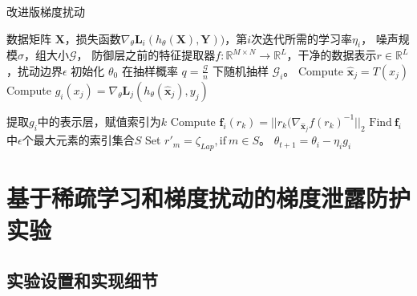 \begin{algorithm}[!htb]
\caption{改进版梯度扰动}
\label{alg:ImprovedDP-SGD}
\begin{algorithmic}[1]
\REQUIRE 数据矩阵 $\mathbf{X}$，损失函数$\nabla_\theta \mathbf{L}_i(h_\theta(\mathbf{X}),\mathbf{Y}))$，第$i$次迭代所需的学习率$\eta_i$， 噪声规模$\sigma$，组大小$\mathcal{G}$， 防御层之前的特征提取器$f: \mathbb{R}^{M \times N} \to \mathbb{R}^L$，干净的数据表示$r \in \mathbb{R}^L$，扰动边界$\epsilon$
\STATE 初始化 $\theta_{0}$
\STATE  在抽样概率 $q=\frac{\mathcal{G}}{n}$ 下随机抽样 $\mathcal{G}_i$。
    \STATE \quad Compute $\widehat{\mathbf{x}}_j = T(x_j)$
    \STATE \quad Compute $g_i(x_j)=\nabla_\theta \mathbf{L}_j(h_\theta(\widehat{\mathbf{x}}_j),y_j)$
\ENDFOR

    \STATE \quad  提取$g_i$中的表示层，赋值索引为$k$
     \STATE \quad Compute $\mathbf{f}_i(r_k)=||r_k(\nabla_{\widehat{\mathbf{x}}_j}f(r_k)^{-1}||_{2}$
     \STATE \quad $\text{Find}\ \mathbf{f}_i$中$\epsilon$个最大元素的索引集合$S$
     \STATE \quad Set $r'_m=\zeta_{Lap},\text{if} \  m \in S$。
\ENDFOR
\STATE  $\theta_{t+1}=\theta_i-\eta_i g_i$
\ENDFOR
\end{algorithmic}
\end{algorithm}

\section{基于稀疏学习和梯度扰动的梯度泄露防护实验}
\subsection{实验设置和实现细节}



